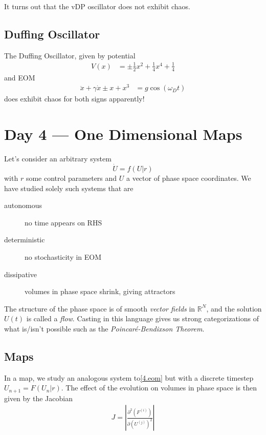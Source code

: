 \documentclass[10pt]{article}
\newcommand{\ptd}[2]{\frac{\partial^2 #1}{\partial#2^2}}
\newcommand{\abs}[1]{\left|#1\right|}
\begin{document}
It turns out that the vDP oscillator does not exhibit chaos.

\subsection{Duffing Oscillator}

The Duffing Oscillator, given by potential
\begin{align}
    V(x) &= \pm \frac{1}{2}x^2 + \frac{1}{4}x^4 + \frac{1}{4}
\end{align}
and EOM
\begin{align}
    \ddot{x} + \gamma \dot{x} \pm x + x^3 &= g\cos(\omega_D t)
\end{align}
does exhibit chaos for both signs apparently!

\section{Day 4 --- One Dimensional Maps}

Let's consider an arbitrary system
\begin{equation}
    \dot{U} = f(U|r)\label{4.eom}
\end{equation}
with $r$ some control parameters and $U$ a vector of phase space coordinates. We
have studied solely such systems that are
\begin{description}
    \item[autonomous] no time appears on RHS
    \item[deterministic] no stochasticity in EOM
    \item[dissipative] volumes in phase space shrink, giving attractors
\end{description}

The structure of the phase space is of smooth \emph{vector fields} in
$\mathbb{R}^N$, and the solution $U(t)$ is called a \emph{flow}. Casting in this
language gives us strong categorizations of what is/isn't possible such as the
\emph{Poincar\'e-Bendixson Theorem}.

\subsection{Maps}

In a map, we study an analogous system to\eqref{4.eom} but with a discrete
timestep $U_{n+1} = F(U_n|r)$. The effect of the evolution on volumes in phase
space is then given by the Jacobian
\begin{align}
    J = \abs{\ptd{(F^{(i)})}{(U^{(j)})}}
\end{align}
\end{document}

